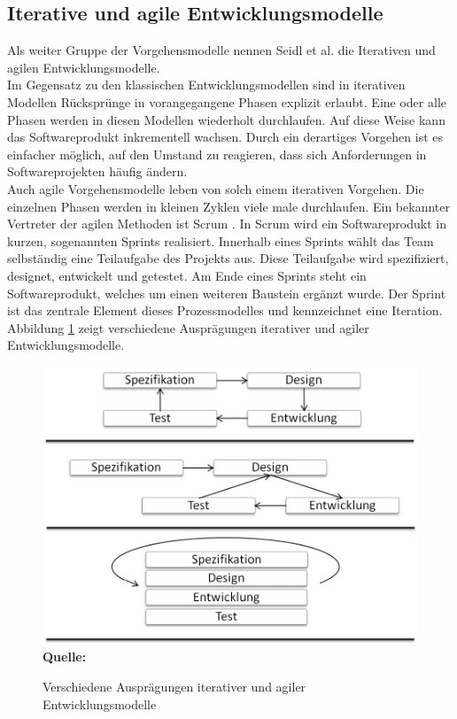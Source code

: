 \subsection{Iterative und agile Entwicklungsmodelle}
\label{subsec:iterative_und_agile_entwicklungsmodelle}
Als weiter Gruppe der Vorgehensmodelle nennen Seidl et al. \cite[vgl. S.23 ff.]{seidl_basiswissen_2012} die Iterativen und agilen Entwicklungsmodelle.\\
Im Gegensatz zu den klassischen Entwicklungsmodellen sind in iterativen Modellen Rücksprünge in vorangegangene Phasen explizit erlaubt. Eine oder alle Phasen werden in diesen Modellen wiederholt durchlaufen. Auf diese Weise kann das Softwareprodukt inkrementell wachsen. Durch ein derartiges Vorgehen ist es einfacher möglich, auf den Umstand zu reagieren, dass sich Anforderungen in Softwareprojekten häufig ändern. \\
Auch agile Vorgehensmodelle leben von solch einem iterativen Vorgehen. Die einzelnen Phasen werden in kleinen Zyklen viele male durchlaufen.
Ein bekannter Vertreter der agilen Methoden ist Scrum \cite{schwaber_agile_2002}. In Scrum wird ein Softwareprodukt in kurzen, sogenannten Sprints realisiert. Innerhalb eines Sprints wählt das Team selbständig eine Teilaufgabe des Projekts aus. Diese Teilaufgabe wird spezifiziert, designet, entwickelt und getestet. Am Ende eines Sprints steht ein Softwareprodukt, welches um einen weiteren Baustein ergänzt wurde.
Der Sprint ist das zentrale Element dieses Prozessmodelles und kennzeichnet eine Iteration.
Abbildung \ref{fig:verschiedene_auspraegungen_iterativer_und_agiler_entwicklungsmodelle} zeigt verschiedene Ausprägungen iterativer und agiler Entwicklungsmodelle.
\begin{figure}[htb]
  \centering  
  \includegraphics[scale=0.8]{img/iterativeentwicklungsmodelle.png}\\
  \footnotesize\sffamily\textbf{Quelle:} \cite[vgl. S.24]{seidl_basiswissen_2012}
  \caption{Verschiedene Ausprägungen iterativer und agiler Entwicklungsmodelle}
  \label{fig:verschiedene_auspraegungen_iterativer_und_agiler_entwicklungsmodelle}
\end{figure}
